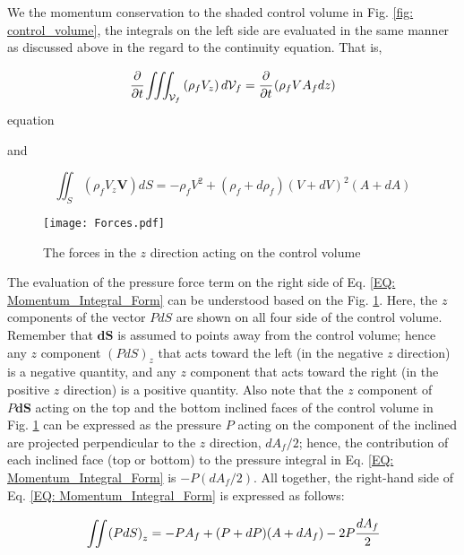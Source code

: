 \documentclass[../Article_Model_Parameters.tex]{subfiles}
\begin{document}
	We the momentum conservation to the shaded control volume in Fig. \ref{fig: control_volume}, the integrals on the left side are evaluated in the same manner as discussed above in the regard to the continuity equation. That is,
	
	{\footnotesize
		\begin{equation}
			\cfrac{\partial}{\partial t} \iiint_{\mathcal{V}_f} \left( \rho_f V_z \right) d \mathcal{V}_f = \cfrac{\partial}{\partial t} \left( \rho_f V A_f dz \right)
			\label{EQ: Force_Continuity_Monenmtum}
		\end{equation}equation
	}
	
	and 
	
	{\footnotesize
		\begin{equation}
			\iint_S \left( \rho_f V_z \textbf{V} \right) dS = -\rho_f V^2 + \left( \rho_f + d \rho_f \right) \left( V+dV \right)^2 \left( A+dA \right)
		\end{equation}
	}
	
	\begin{figure}[h]
		\centering
		\texttt{[image: Forces.pdf]}
		\caption{The forces in the $z$ direction acting on the control volume}
		\label{fig: Forces_Momentum_Control_Volume}
	\end{figure}
	
	The evaluation of the pressure force term on the right side of Eq. \ref{EQ: Momentum_Integral_Form} can be understood based on the Fig. \ref{fig: Forces_Momentum_Control_Volume}. Here, the $z$ components of the vector $PdS$ are shown on all four side of the control volume. Remember that $\textbf{dS}$ is assumed to points away from the control volume; hence  any $z$ component $\left( PdS \right)_z$ that acts toward the left (in the negative $z$ direction) is a negative quantity, and any $z$ component that acts toward the right (in the positive $z$ direction) is a positive quantity. Also note that the $z$ component of $P\textbf{dS}$ acting on the top and the bottom inclined faces of the control volume in Fig. \ref{fig: Forces_Momentum_Control_Volume} can be expressed as the pressure $P$ acting on the component of the inclined are projected perpendicular to the $z$ direction, $dA_f/2$; hence, the contribution of each inclined face (top or bottom) to the pressure integral in Eq. \ref{EQ: Momentum_Integral_Form} is $-P(dA_f/2)$. All together, the right-hand side of Eq. \ref{EQ: Momentum_Integral_Form} is expressed as follows:
	
	{\footnotesize
		\begin{equation}
			\iint \left( PdS \right)_z = -PA_f + (P+dP)(A+dA_f)-2P\cfrac{dA_f}{2}
			\label{EQ: Force_Integral_Varying_Cross_Section}
		\end{equation}
	}
	
\end{document}
